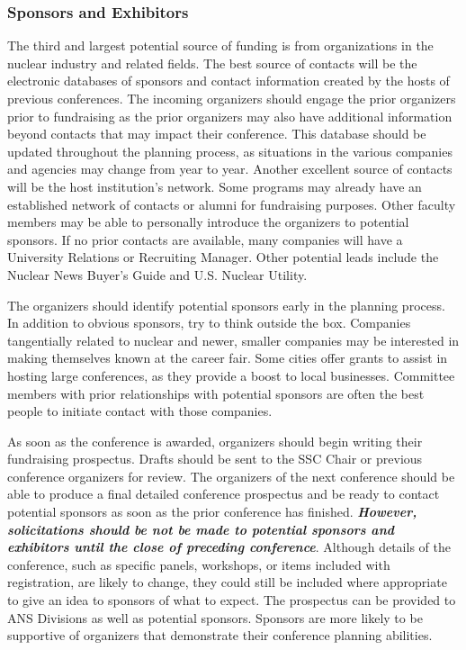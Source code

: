 \documentclass[12pt]{article}
\begin{document}
\subsubsection{Sponsors and Exhibitors}
The third and largest potential source of funding is from organizations in the nuclear industry and related fields.
The best source of contacts will be the electronic databases of sponsors and contact information created by the hosts of previous conferences.
The incoming organizers should engage the prior organizers prior to fundraising as the prior organizers may also have additional information beyond contacts that may impact their conference.
This database should be updated throughout the planning process, as situations in the various companies and agencies may change from year to year.
Another excellent source of contacts will be the host institution's network.
Some programs may already have an established network of contacts or alumni for fundraising purposes.
Other faculty members may be able to personally introduce the organizers to potential sponsors.
If no prior contacts are available, many companies will have a University Relations or Recruiting Manager.
Other potential leads include the Nuclear News Buyer's Guide and U.S. Nuclear Utility.

The organizers should identify potential sponsors early in the planning process.
In addition to obvious sponsors, try to think outside the box.
Companies tangentially related to nuclear and newer, smaller companies may be interested in making themselves known at the career fair.
Some cities offer grants to assist in hosting large conferences, as they provide a boost to local businesses.
Committee members with prior relationships with potential sponsors are often the best people to initiate contact with those companies.

As soon as the conference is awarded, organizers should begin writing their fundraising prospectus.
Drafts should be sent to the SSC Chair or previous conference organizers for review.
The organizers of the next conference should be able to produce a final detailed conference prospectus and be ready to contact potential sponsors as soon as the prior conference has finished. 
\emph{\textbf{However, solicitations should be not be made to potential sponsors and exhibitors until the close of preceding conference}}.
Although details of the conference, such as specific panels, workshops, or items included with registration, are likely to change, they could still be included where appropriate to give an idea to sponsors of what to expect.
The prospectus can be provided to ANS Divisions as well as potential sponsors.
Sponsors are more likely to be supportive of organizers that demonstrate their conference planning abilities.
\end{document}
